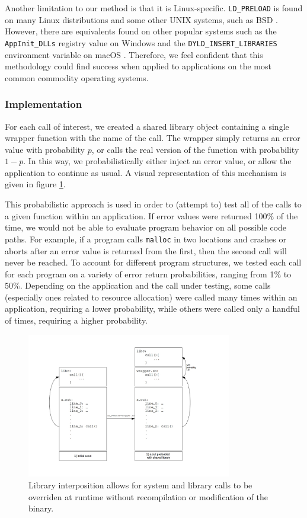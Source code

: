 Another limitation to our method is that it is Linux-specific. \texttt{LD\_PRELOAD} is found on many Linux distributions and some other UNIX systems, such as BSD \cite{bsd}. However, there are equivalents found on other popular systems such as the \texttt{AppInit\_DLLs} registry value on Windows \cite{dll} and the \texttt{DYLD\_INSERT\_LIBRARIES} environment variable on macOS \cite{macos}. Therefore, we feel confident that this methodology could find success when applied to applications on the most common commodity operating systems.

\subsubsection{Implementation}\label{ld_preload_implementation}
For each call of interest, we created a shared library object containing a single wrapper function with the name of the call. The wrapper simply returns an error value with probability $p$, or calls the real version of the function with probability $1-p$. In this way, we probabilistically either inject an error value, or allow the application to continue as usual. A visual representation of this mechanism is given in figure \ref{fig:ld_preload}.

This probabilistic approach is used in order to (attempt to) test all of the calls to a given function within an application. If error values were returned 100\% of the time, we would not be able to evaluate program behavior on all possible code paths. For example, if a program calls \texttt{malloc} in two locations and crashes or aborts after an error value is returned from the first, then the second call will never be reached. To account for different program structures, we tested each call for each program on a variety of error return probabilities, ranging from 1\% to 50\%. Depending on the application and the call under testing, some calls (especially ones related to resource allocation) were called many times within an application, requiring a lower probability, while others were called only a handful of times, requiring a higher probability.
\begin{figure}
  \centering
	\includegraphics[width=0.8\textwidth]{ldpreload_fig}
	\caption{Library interposition allows for system and library calls to be overriden at runtime without recompilation or modification of the binary.}
  \label{fig:ld_preload}
\end{figure}

